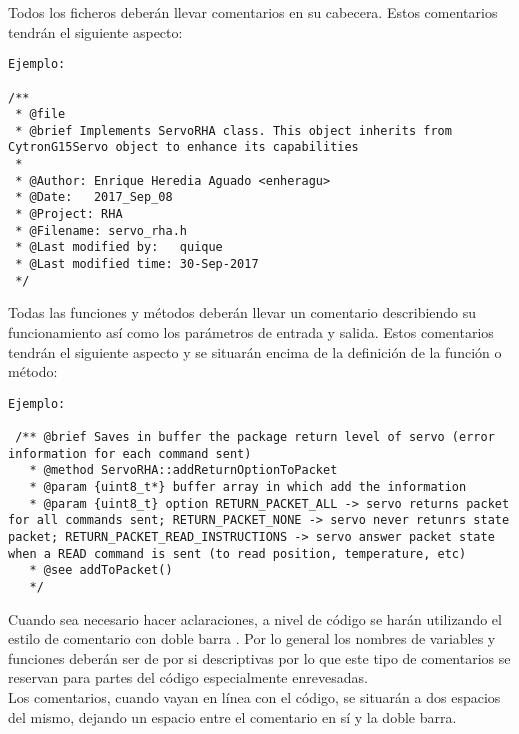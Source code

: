 
Todos los ficheros deberán llevar comentarios en su cabecera. Estos comentarios tendrán el siguiente aspecto:
\\ 

    \lstset{language=C, breaklines=true, basicstyle=\footnotesize}
    \begin{lstlisting}[frame=single]
Ejemplo: 
    
/**
 * @file
 * @brief Implements ServoRHA class. This object inherits from CytronG15Servo object to enhance its capabilities
 *
 * @Author: Enrique Heredia Aguado <enheragu>
 * @Date:   2017_Sep_08
 * @Project: RHA
 * @Filename: servo_rha.h
 * @Last modified by:   quique
 * @Last modified time: 30-Sep-2017
 */

    \end{lstlisting}
    



Todas las funciones y métodos deberán llevar un comentario describiendo su funcionamiento así como los parámetros de entrada y salida. Estos comentarios tendrán el siguiente aspecto y se situarán encima de la definición de la función o método:
\\ 

    \lstset{language=C, breaklines=true, basicstyle=\footnotesize}
    \begin{lstlisting}[frame=single]
Ejemplo: 
    
 /** @brief Saves in buffer the package return level of servo (error information for each command sent)
   * @method ServoRHA::addReturnOptionToPacket
   * @param {uint8_t*} buffer array in which add the information
   * @param {uint8_t} option RETURN_PACKET_ALL -> servo returns packet for all commands sent; RETURN_PACKET_NONE -> servo never retunrs state packet; RETURN_PACKET_READ_INSTRUCTIONS -> servo answer packet state when a READ command is sent (to read position, temperature, etc)
   * @see addToPacket()
   */

    \end{lstlisting}
    

	
    Cuando sea necesario hacer aclaraciones, a nivel de código se harán utilizando el estilo de comentario con doble barra \codigo{//}. Por lo general los nombres de variables y funciones deberán ser de por si descriptivas por lo que este tipo de comentarios se reservan para partes del código especialmente enrevesadas.
    \\ 
    Los comentarios, cuando vayan en línea con el código, se situarán a dos espacios del mismo, dejando un espacio entre el comentario en sí y la doble barra.
    
